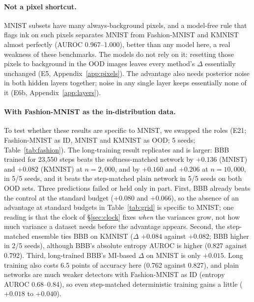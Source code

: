\documentclass[10pt]{article}
\begin{document}
\paragraph{Not a pixel shortcut.} MNIST subsets have many always-background
pixels, and a model-free rule that flags ink on such pixels separates MNIST
from Fashion-MNIST and KMNIST almost perfectly (AUROC 0.967--1.000), better
than any model here, a real weakness of these benchmarks. The models do not rely on it: resetting those
pixels to background in the OOD images leaves every method's $\Delta$
essentially unchanged (E5, Appendix~\ref{app:pixels}). The advantage also needs
posterior noise in both hidden layers together; noise in any single layer
keeps essentially none of it (E6b, Appendix~\ref{app:layers}).

\paragraph{With Fashion-MNIST as the in-distribution data.}\label{sec:fashion}
To test whether these results are specific to MNIST, we swapped the roles
(E21; Fashion-MNIST as ID, MNIST and KMNIST as OOD; 5 seeds;
Table~\ref{tab:fashion}). The long-training result replicates and is larger:
BBB trained for 23{,}550 steps beats the softness-matched network by $+0.136$
(MNIST) and $+0.082$ (KMNIST) at $n=2{,}000$, and by $+0.160$ and $+0.206$ at
$n=10{,}000$, in 5/5 seeds, and it beats the step-matched plain network in 5/5
seeds on both OOD sets. Three predictions failed or held only in part. First,
BBB already beats the control at the standard budget ($+0.080$ and $+0.066$),
so the absence of an advantage at standard budgets in Table~\ref{tab:grid} is
specific to MNIST; one reading is that the clock of \S\ref{sec:clock} fixes
\emph{when} the variances grow, not how much variance a dataset needs before
the advantage appears. Second, the step-matched ensemble ties BBB on KMNIST
($\Delta$ $+0.084$ against $+0.082$; BBB higher in 2/5 seeds), although BBB's
absolute entropy AUROC is higher (0.827 against 0.792). Third, long-trained
BBB's MI-based $\Delta$ on MNIST is only $+0.015$. Long training also costs 6.5
points of accuracy here (0.762 against 0.827), and plain networks are much
weaker detectors with Fashion-MNIST as ID (entropy AUROC 0.68--0.84), so even
step-matched deterministic training gains a little ($+0.018$ to $+0.040$).
\end{document}
